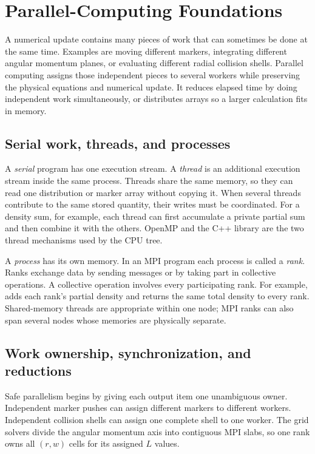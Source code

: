 \section{Parallel-Computing Foundations}

A numerical update contains many pieces of work that can sometimes be done at
the same time.  Examples are moving different markers, integrating different
angular momentum planes, or evaluating different radial collision shells.
Parallel computing assigns those independent pieces to several workers
while preserving the physical equations and numerical update. It reduces
elapsed time by doing independent work simultaneously, or distributes arrays
so a larger calculation fits in memory.

\subsection{Serial work, threads, and processes}

A \emph{serial} program has one execution stream.  A \emph{thread} is an
additional execution stream inside the same process.  Threads share the same
memory, so they can read one distribution or marker array without copying it.
When several threads contribute to the same stored quantity, their writes
must be coordinated. For a density sum, for example, each thread can first
accumulate a private partial sum and then combine it with the others.
OpenMP and the C++  library are the two thread mechanisms
used by the CPU tree.

A \emph{process} has its own memory.  In an MPI program each process is called
a \emph{rank}.  Ranks exchange data by sending messages or by taking part in
collective operations.  A collective operation involves every participating
rank.  For example,  adds each rank's partial density and
returns the same total density to every rank.  Shared-memory threads are
appropriate within one node; MPI ranks can also span several nodes whose
memories are physically separate.

\subsection{Work ownership, synchronization, and reductions}

Safe parallelism begins by giving each output item one unambiguous owner.
Independent marker pushes can assign different markers to different workers.
Independent collision shells can assign one complete shell to one worker.
The grid solvers divide the angular momentum axis into contiguous MPI slabs,
so one rank owns all \((r,w)\) cells for its assigned \(L\) values.

